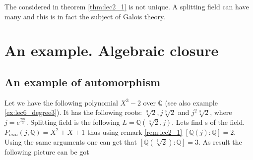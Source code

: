 \begin{remark}
  The  considered in theorem \ref{thm:lec2_1}
  is not unique. A splitting field  can 
  have many  and this is in fact the subject
  of Galois theory.
\end{remark}

\section{An example. Algebraic closure}

\subsection{An example of automorphism}

\begin{example}
  Let we have the following polynomial $X^3-2$ over $\mathbb{Q}$
  (see also example \ref{ex:lec6_degree3}).
  It
  has the following roots: $\sqrt[3]{2}, j\sqrt[3]{2}$ and
  $j^2\sqrt[3]{2}$, where $j = e^{\frac{2 \pi i}{3}}$. Splitting field
  is the following $L = \mathbb{Q}\left(\sqrt[3]{2}, j\right)$. Lets
  find s of the field.
  $P_{min}\left(j, \mathbb{Q}\right) = X^2 + X + 1$ thus using remark
  \ref{rem:lec2_1} 
  $\left[\mathbb{Q}\left(j\right) : \mathbb{Q}\right] = 2$.
  Using the same arguments one can get that
  $\left[\mathbb{Q}\left(\sqrt[3]{2}\right) : \mathbb{Q}\right] = 3$.
  As result the following picture can be got
  


\end{example}
